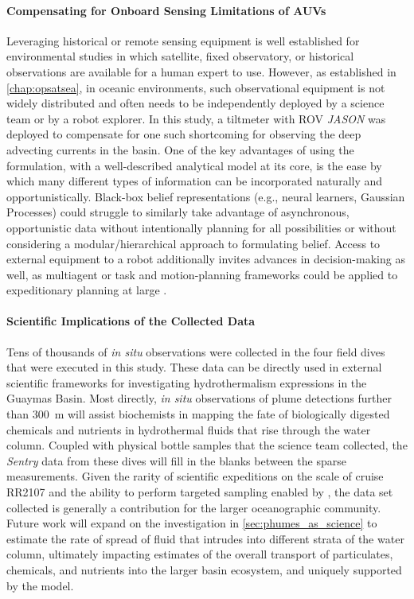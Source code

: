 \paragraph{Compensating for Onboard Sensing Limitations of AUVs}
Leveraging historical or remote sensing equipment is well established for environmental studies in which satellite, fixed observatory, or historical observations are available for a human expert to use. However, as established in \cref{chap:opsatsea}, in oceanic environments, such observational equipment is not widely distributed and often needs to be independently deployed by a science team or by a robot explorer. In this study, a tiltmeter with ROV \emph{JASON} was deployed to compensate for one such shortcoming for observing the deep advecting currents in the basin. One of the key advantages of using the \PHUMES formulation, with a well-described analytical model at its core, is the ease by which many different types of information can be incorporated naturally and opportunistically. Black-box belief representations (e.g., neural learners, Gaussian Processes) could struggle to similarly take advantage of asynchronous, opportunistic data without intentionally planning for all possibilities or without considering a modular/hierarchical approach to formulating belief. Access to external equipment to a robot additionally invites advances in decision-making as well, as multiagent \autocite{salam2019adaptive,li2014multi,luo2018adaptive,ouyang2014multi} or task and motion-planning frameworks could be applied to expeditionary planning at large \autocite{timmons2019automated}. 

\paragraph{Scientific Implications of the Collected Data}
Tens of thousands of \emph{in situ} observations were collected in the four field dives that were executed in this study. These data can be directly used in external scientific frameworks for investigating hydrothermalism expressions in the Guaymas Basin. Most directly, \emph{in situ} observations of plume detections further than \SI{300}{\meter} will assist biochemists in mapping the fate of biologically digested chemicals and nutrients in hydrothermal fluids that rise through the water column. Coupled with physical bottle samples that the science team collected, the \emph{Sentry} data from these dives will fill in the blanks between the sparse measurements. Given the rarity of scientific expeditions on the scale of cruise RR2107 and the ability to perform targeted sampling enabled by \PHORTEX, the data set collected is generally a contribution for the larger oceanographic community. Future work will expand on the investigation in \cref{sec:phumes_as_science} to estimate the rate of spread of fluid that intrudes into different strata of the water column, ultimately impacting estimates of the overall transport of particulates, chemicals, and nutrients into the larger basin ecosystem, and uniquely supported by the \PHUMES model.

